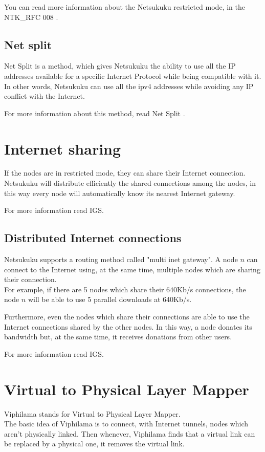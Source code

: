 \documentclass[a4paper]{article}
\begin{document}
You can read more information about the Netsukuku restricted mode, in the
NTK\_RFC 008 \cite{restrictedip}.

\subsection{Net split}
Net Split is a method, which gives Netsukuku the ability to use all the IP
addresses available for a specific Internet Protocol while being compatible
with it.\\
In other words, Netsukuku can use all the ipv4 addresses while avoiding any IP
conflict with the Internet.

For more information about this method, read Net Split \cite{netsplit}.

\section{Internet sharing}
If the nodes are in restricted mode, they can share their Internet connection.
Netsukuku will distribute efficiently the shared connections among the nodes,
in this way every node will automatically know its nearest Internet gateway.

For more information read IGS\cite{IGS}.

\subsection{Distributed Internet connections}
Netsukuku supports a routing method called "multi inet gateway".
A node $n$ can connect to the Internet using, at the same time, multiple
nodes which are sharing their connection.\\
For example, if there are 5 nodes which share their 640Kb/s connections, the
node $n$ will be able to use 5 parallel downloads at 640Kb/s.

Furthermore, even the nodes which share their connections are able to
use the Internet connections shared by the other nodes. In this way, a node
donates its bandwidth but, at the same time, it receives donations from other
users.

For more information read IGS\cite{IGS}.

\section{Virtual to Physical Layer Mapper}
Viphilama stands for \textrm{Virtual to Physical Layer Mapper}.\\
The basic idea of Viphilama is to connect, with Internet tunnels, nodes which
aren't physically linked.
Then whenever, Viphilama finds that a virtual link can be replaced by a
physical one, it removes the virtual link.
\end{document}
